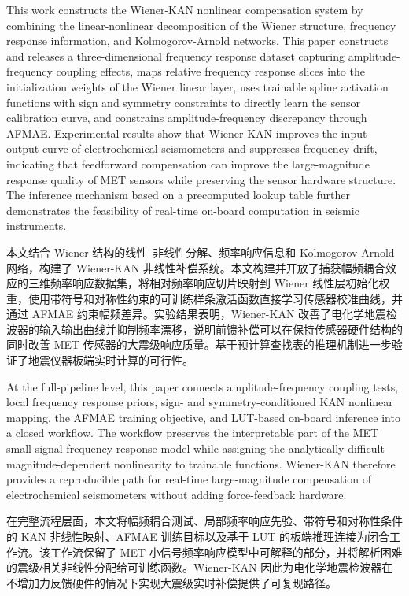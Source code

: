 \documentclass[sn-nature]{sn-jnl}
\newif\ifCNENEnglish
\newif\ifCNENBilingual
\newcommand{\CNEN}[2]{%
    \ifCNENBilingual
        #1%
        \if\relax\detokenize{#2}\relax\else\par #2\fi%
    \else
        \ifCNENEnglish
            #2%
        \else
            #1%
        \fi
    \fi
}
\begin{document}
\CNEN{本文结合 Wiener 结构的线性--非线性分解、频率响应信息和 Kolmogorov-Arnold 网络，构建了 Wiener-KAN 非线性补偿系统。本文构建并开放了捕获幅频耦合效应的三维频率响应数据集，将相对频率响应切片映射到 Wiener 线性层初始化权重，使用带符号和对称性约束的可训练样条激活函数直接学习传感器校准曲线，并通过 AFMAE 约束幅频差异。实验结果表明，Wiener-KAN 改善了电化学地震检波器的输入输出曲线并抑制频率漂移，说明前馈补偿可以在保持传感器硬件结构的同时改善 MET 传感器的大震级响应质量。基于预计算查找表的推理机制进一步验证了地震仪器板端实时计算的可行性。}{This work constructs the Wiener-KAN nonlinear compensation system by combining the linear-nonlinear decomposition of the Wiener structure, frequency response information, and Kolmogorov-Arnold networks. This paper constructs and releases a three-dimensional frequency response dataset capturing amplitude-frequency coupling effects, maps relative frequency response slices into the initialization weights of the Wiener linear layer, uses trainable spline activation functions with sign and symmetry constraints to directly learn the sensor calibration curve, and constrains amplitude-frequency discrepancy through AFMAE. Experimental results show that Wiener-KAN improves the input-output curve of electrochemical seismometers and suppresses frequency drift, indicating that feedforward compensation can improve the large-magnitude response quality of MET sensors while preserving the sensor hardware structure. The inference mechanism based on a precomputed lookup table further demonstrates the feasibility of real-time on-board computation in seismic instruments.%
}

\CNEN{在完整流程层面，本文将幅频耦合测试、局部频率响应先验、带符号和对称性条件的 KAN 非线性映射、AFMAE 训练目标以及基于 LUT 的板端推理连接为闭合工作流。该工作流保留了 MET 小信号频率响应模型中可解释的部分，并将解析困难的震级相关非线性分配给可训练函数。Wiener-KAN 因此为电化学地震检波器在不增加力反馈硬件的情况下实现大震级实时补偿提供了可复现路径。}{At the full-pipeline level, this paper connects amplitude-frequency coupling tests, local frequency response priors, sign- and symmetry-conditioned KAN nonlinear mapping, the AFMAE training objective, and LUT-based on-board inference into a closed workflow. The workflow preserves the interpretable part of the MET small-signal frequency response model while assigning the analytically difficult magnitude-dependent nonlinearity to trainable functions. Wiener-KAN therefore provides a reproducible path for real-time large-magnitude compensation of electrochemical seismometers without adding force-feedback hardware.}
\end{document}
